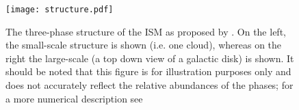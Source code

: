 \begin{figure}
    \centering

    \texttt{[image: structure.pdf]}

    \caption{The three-phase structure of the ISM as proposed by \citet{Ostriker1977}.
    On the left, the small-scale structure is shown (i.e. one cloud), whereas on the right the large-scale (a top down view of a galactic disk) is shown.
    It should be noted that this figure is for illustration purposes only and does not accurately reflect the relative abundances of the phases; for a more numerical description see \citet{ferriere2001}}
    \label{fig:struct}
\end{figure}
